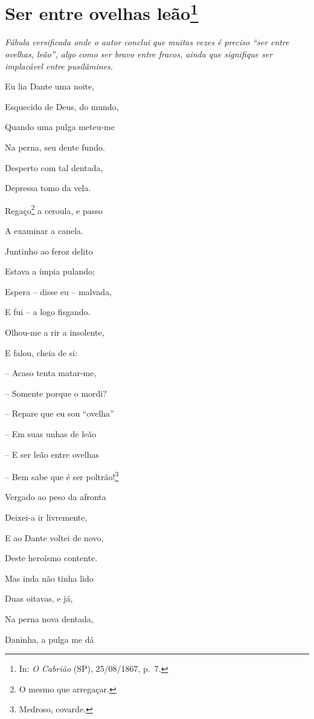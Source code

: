 \chapter{Ser entre ovelhas leão\footnote{In: 
\emph{O Cabrião} (SP), 25/08/1867, p.~7.}}

\begin{didascalia}
\emph{Fábula versificada onde o autor conclui que muitas vezes é preciso
``ser entre ovelhas, leão'', algo como ser bravo entre fracos, ainda que
signifique ser implacável entre pusilâmines.}
\end{didascalia}

\asterisc{}

Eu lia Dante uma noite,

Esquecido de Deus, do mundo,

Quando uma pulga meteu-me

Na perna, seu dente fundo.

Desperto com tal dentada,

Depressa tomo da vela.

Regaço\footnote{ O mesmo que arregaçar.} a ceroula, e passo

A examinar a canela.

Juntinho ao feroz delito

Estava a ímpia pulando;

Espera -- disse eu -- malvada,

E fui -- a logo fisgando.

Olhou-me a rir a insolente,

E falou, cheia de si:

-- Acaso tenta matar-me,

-- Somente porque o mordi?

-- Repare que eu sou ``ovelha''

-- Em suas unhas de leão

-- E ser leão entre ovelhas

-- Bem sabe que é ser poltrão!\footnote{ Medroso, covarde.}

Vergado ao peso da afronta

Deixei-a ir livremente,

E ao Dante voltei de novo,

Deste heroísmo contente.

Mas inda não tinha lido

Duas oitavas, e já,

Na perna nova dentada,

Daninha, a pulga me dá

